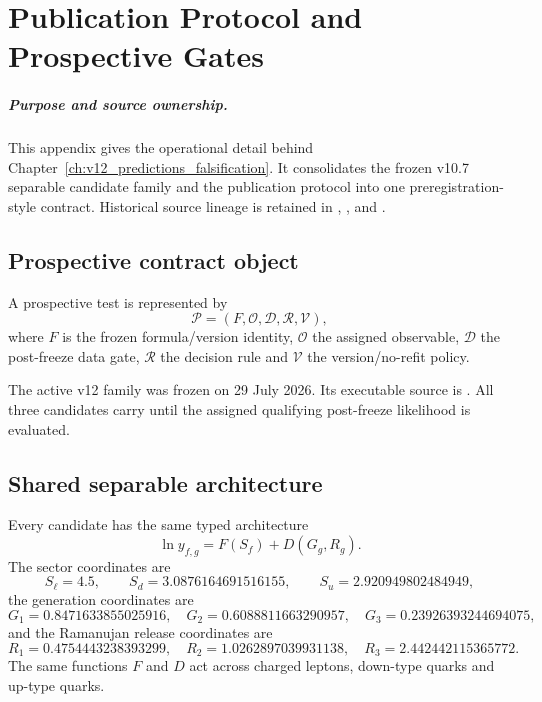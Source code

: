 \chapter{Publication Protocol and Prospective Gates}
\label{app:v12_publication_protocol}

\paragraph{Purpose and source ownership.}
This appendix gives the operational detail behind
Chapter~\ref{ch:v12_predictions_falsification}.  It consolidates the frozen
v10.7 separable candidate family and the publication protocol into one
preregistration-style contract.  Historical source lineage is retained in
,
, and
.

\section{Prospective contract object}

A prospective test is represented by
\[
\boxed{
\mathcal P=(F,\mathcal O,\mathcal D,\mathcal R,\mathcal V),
}
\]
where \(F\) is the frozen formula/version identity, \(\mathcal O\) the assigned
observable, \(\mathcal D\) the post-freeze data gate, \(\mathcal R\) the decision
rule and \(\mathcal V\) the version/no-refit policy.

The active v12 family was frozen on 29 July 2026.  Its executable source is
.
All three candidates carry
until the assigned qualifying post-freeze likelihood is evaluated.

\section{Shared separable architecture}

Every candidate has the same typed architecture
\[
\boxed{
\ln y_{f,g}=F(S_f)+D(G_g,R_g).
}
\]
The sector coordinates are
\[
S_\ell=4.5,\qquad
S_d=3.0876164691516155,\qquad
S_u=2.920949802484949,
\]
the generation coordinates are
\[
G_1=0.8471633855025916,\quad
G_2=0.6088811663290957,\quad
G_3=0.23926393244694075,
\]
and the Ramanujan release coordinates are
\[
R_1=0.4754443238393299,\quad
R_2=1.0262897039931138,\quad
R_3=2.442442115365772.
\]
The same functions \(F\) and \(D\) act across charged leptons, down-type quarks
and up-type quarks.

